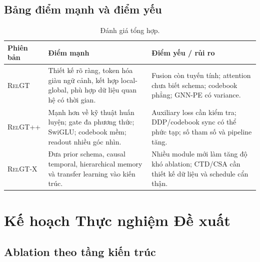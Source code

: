 \documentclass[12pt,a4paper]{article}
\newcommand{\RelGT}{\textsc{RelGT}}
\newcommand{\RelGTpp}{\textsc{RelGT++}}
\newcommand{\RelGTx}{\textsc{RelGT-X}}
\begin{document}
\subsection{Bảng điểm mạnh và điểm yếu}

\begin{table}[H]
\centering\small
\caption{Đánh giá tổng hợp.}
\begin{tabularx}{\textwidth}{lXX}
\toprule
\textbf{Phiên bản} & \textbf{Điểm mạnh} & \textbf{Điểm yếu / rủi ro} \\
\midrule
\RelGT{} &
Thiết kế rõ ràng, token hóa giàu ngữ cảnh, kết hợp local-global, phù hợp
dữ liệu quan hệ có thời gian. &
Fusion còn tuyến tính; attention chưa biết schema; codebook phẳng; GNN-PE
có variance. \\
\RelGTpp{} &
Mạnh hơn về kỹ thuật huấn luyện; gate đa phương thức; SwiGLU; codebook mềm;
readout nhiều góc nhìn. &
Auxiliary loss cần kiểm tra; DDP/codebook sync có thể phức tạp; số tham số
và pipeline tăng. \\
\RelGTx{} &
Đưa prior schema, causal temporal, hierarchical memory và transfer learning
vào kiến trúc. &
Nhiều module mới làm tăng độ khó ablation; CTD/CSA cần thiết kế dữ liệu và
schedule cẩn thận. \\
\bottomrule
\end{tabularx}
\end{table}

\section{Kế hoạch Thực nghiệm Đề xuất}

\subsection{Ablation theo tầng kiến trúc}
\end{document}
